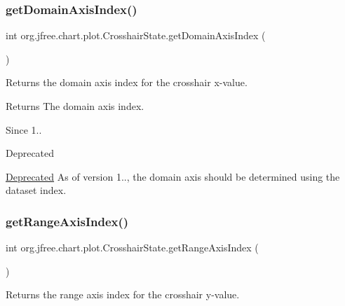 \subsubsection{\texorpdfstring{get\+Domain\+Axis\+Index()}{getDomainAxisIndex()}}
{\footnotesize\ttfamily int org.\+jfree.\+chart.\+plot.\+Crosshair\+State.\+get\+Domain\+Axis\+Index (\begin{DoxyParamCaption}{ }\end{DoxyParamCaption})}

Returns the domain axis index for the crosshair x-\/value.

\begin{DoxyReturn}{Returns}
The domain axis index.
\end{DoxyReturn}
\begin{DoxySince}{Since}
1..
\end{DoxySince}
\begin{DoxyRefDesc}{Deprecated}
\item[\mbox{\hyperlink{deprecated__deprecated000060}{Deprecated}}]As of version 1.., the domain axis should be determined using the dataset index. \end{DoxyRefDesc}
\mbox{\label{classorg_1_1jfree_1_1chart_1_1plot_1_1_crosshair_state_a1d8ed3f6288c58aa0ea6c6eac78765b2}} 
\subsubsection{\texorpdfstring{get\+Range\+Axis\+Index()}{getRangeAxisIndex()}}
{\footnotesize\ttfamily int org.\+jfree.\+chart.\+plot.\+Crosshair\+State.\+get\+Range\+Axis\+Index (\begin{DoxyParamCaption}{ }\end{DoxyParamCaption})}

Returns the range axis index for the crosshair y-\/value.

